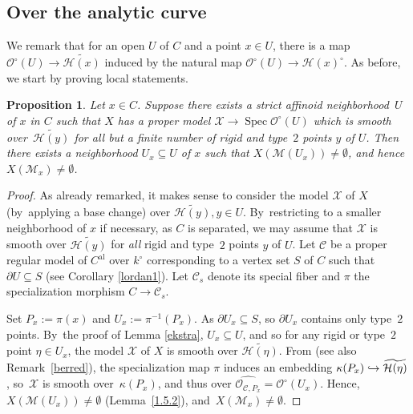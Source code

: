\documentclass[JEP,XML,SOM,Unicode,NoFloatCountersInSection,published]{cedram}
\newcommand{\hto}{\mathrel{\lhook\joinrel\to}}
\newcommand{\al}{\mathrm{al}}
\DeclareMathOperator{\Spec}{Spec}
\newtheorem{prop}[thm]{Proposition}
\theoremstyle{definition}
\begin{document}
\subsection{Over the analytic curve} \label{ana}
We remark that for an open $U$ of $C$ and a point $x \in U$, there is a map $\mathcal{O}^{\circ}(U) \to \widetilde{\mathcal{H}(x)}$ induced by the natural map $\mathcal{O}^{\circ}(U) \to \mathcal{H}(x)^{\circ}$. As before, we start by proving local statements.

\begin{prop} \label{3.1}
Let $x \in C$. Suppose there exists a strict affinoid neighborhood~$U$ of $x$ in $C$ such that $X$ has a proper model $\mathcal{X} \to \Spec \mathcal{O}^{\circ}(U)$ which is smooth over~$\widetilde{\mathcal{H}(y)}$ for all but a finite number of rigid and type~$2$ points $y$ of $U$.
Then there exists a neighborhood $U_x \subseteq U$ of $x$ such that $X(\mathscr{M}(U_x)) \neq \emptyset$, and hence $X(\mathscr{M}_x) \neq \emptyset$.
\end{prop}

\begin{proof} As already remarked, it makes sense to consider the model $\mathcal{X}$ of $X$ (by~applying a base change) over $\widetilde{\mathcal{H}(y)}, y\in U$.
By~restricting to a smaller neighborhood of $x$ if necessary, as $C$ is separated, we may assume that $\mathcal{X}$ is smooth over $\widetilde{\mathcal{H}(y)}$ for \emph{all} rigid and type~$2$ points $y$ of $U$. Let $\mathscr{C}$ be a proper regular model of $C^{\al}$ over $k^{\circ}$ corresponding to a vertex set $S$ of $C$ such that $\partial{U} \subseteq S$ (see Corollary \ref{lordan1}). Let $\mathscr{C}_s$ denote its special fiber and $\pi$ the specialization morphism $C \to \mathscr{C}_s$.

Set $P_x:=\pi(x)$ and $U_x:=\pi^{-1}(P_x)$. As $\partial{U_x} \subseteq S$, so $\partial{U_x}$ contains only type~$2$ points.
By~the proof of Lemma \ref{ekstra}, $U_x \subseteq U$, and so for any rigid or type~$2$ point $\eta \in U_x$, the model $\mathcal{X}$ of $X$ is smooth over $\widetilde{\mathcal{H}(\eta)}$. From \cite[2.4, p.\,35]{Ber90} (see also Remark~\ref{berred}), the specialization map $\pi$ induces an embedding $\kappa(P_x) \hto \widetilde{\mathcal{H}(\eta)}$, so~$\mathcal{X}$ is smooth over~$\kappa(P_x)$, and thus over $\widehat{\mathcal{O}_{\mathscr{C}, P_x}}=\mathcal{O}^{\circ}(U_x)$. Hence, $X(\mathscr{M}(U_x)) \neq \emptyset$ (\cf Lemma~\ref{1.5.2}), and~$X(\mathscr{M}_x) \neq \emptyset$.
\end{proof}
\end{document}
